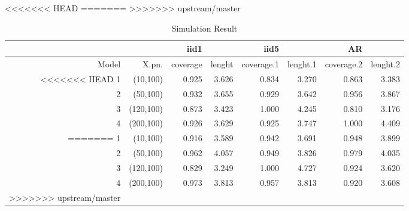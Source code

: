 \documentclass[11pt,oneside, a4paper]{amsart}\usepackage[]{graphicx}\usepackage[]{color}
\begin{document}
<<<<<<< HEAD
=======
>>>>>>> upstream/master
\begin{table}[ht]
\centering
\caption{Simulation Result} 
\label{Test_table}
{\footnotesize
\begin{tabular}{|r|r|rr|rr|rr|}
  \toprule 
    &  & iid1 &  & iid5 & & AR & \\
 \midrule 
Model & X.pn. & coverage & lenght & coverage.1 & lenght.1 & coverage.2 & lenght.2 \\ 
<<<<<<< HEAD
    1 & (10,100) & 0.925 & 3.626 & 0.834 & 3.270 & 0.863 & 3.383 \\ 
     2 & (50,100) & 0.932 & 3.655 & 0.929 & 3.642 & 0.956 & 3.867 \\ 
     3 & (120,100) & 0.873 & 3.423 & 1.000 & 4.245 & 0.810 & 3.176 \\ 
     4 & (200,100) & 0.926 & 3.629 & 0.925 & 3.747 & 1.000 & 4.409 \\ 
=======
    1 & (10,100) & 0.916 & 3.589 & 0.942 & 3.691 & 0.948 & 3.899 \\ 
     2 & (50,100) & 0.962 & 4.057 & 0.949 & 3.826 & 0.979 & 4.035 \\ 
     3 & (120,100) & 0.829 & 3.249 & 1.000 & 4.727 & 0.924 & 3.620 \\ 
     4 & (200,100) & 0.973 & 3.813 & 0.957 & 3.813 & 0.920 & 3.608 \\ 
>>>>>>> upstream/master
   \bottomrule 
\end{tabular}
}
\end{table}
\end{document}
